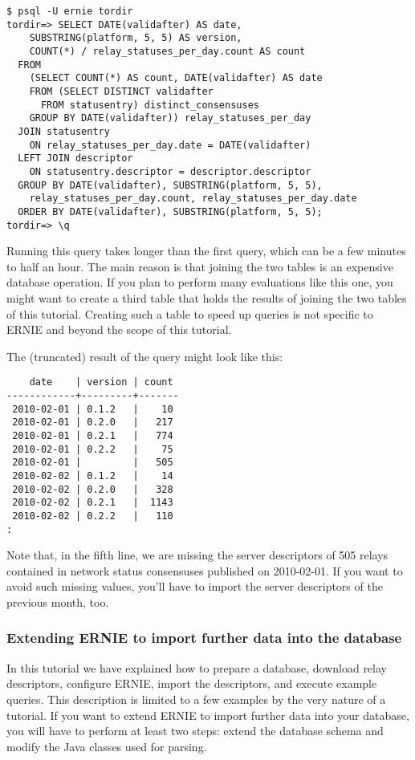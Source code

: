\documentclass{article}
\begin{document}
\begin{verbatim}
$ psql -U ernie tordir
tordir=> SELECT DATE(validafter) AS date,
    SUBSTRING(platform, 5, 5) AS version,
    COUNT(*) / relay_statuses_per_day.count AS count
  FROM
    (SELECT COUNT(*) AS count, DATE(validafter) AS date
    FROM (SELECT DISTINCT validafter
      FROM statusentry) distinct_consensuses
    GROUP BY DATE(validafter)) relay_statuses_per_day
  JOIN statusentry
    ON relay_statuses_per_day.date = DATE(validafter)
  LEFT JOIN descriptor
    ON statusentry.descriptor = descriptor.descriptor
  GROUP BY DATE(validafter), SUBSTRING(platform, 5, 5),
    relay_statuses_per_day.count, relay_statuses_per_day.date
  ORDER BY DATE(validafter), SUBSTRING(platform, 5, 5);
tordir=> \q
\end{verbatim}

Running this query takes longer than the first query, which can be a few
minutes to half an hour.
The main reason is that joining the two tables is an expensive database
operation.
If you plan to perform many evaluations like this one, you might want to
create a third table that holds the results of joining the two tables of
this tutorial.
Creating such a table to speed up queries is not specific to ERNIE and
beyond the scope of this tutorial.

The (truncated) result of the query might look like this:

\begin{verbatim}
    date    | version | count
------------+---------+-------
 2010-02-01 | 0.1.2   |    10
 2010-02-01 | 0.2.0   |   217
 2010-02-01 | 0.2.1   |   774
 2010-02-01 | 0.2.2   |    75
 2010-02-01 |         |   505
 2010-02-02 | 0.1.2   |    14
 2010-02-02 | 0.2.0   |   328
 2010-02-02 | 0.2.1   |  1143
 2010-02-02 | 0.2.2   |   110
:
\end{verbatim}

Note that, in the fifth line, we are missing the server descriptors of 505
relays contained in network status consensuses published on 2010-02-01.
If you want to avoid such missing values, you'll have to import the server
descriptors of the previous month, too.

\subsubsection{Extending ERNIE to import further data into the database}

In this tutorial we have explained how to prepare a database, download
relay descriptors, configure ERNIE, import the descriptors, and execute
example queries.
This description is limited to a few examples by the very nature of a
tutorial.
If you want to extend ERNIE to import further data into your database,
you will have to perform at least two steps:
extend the database schema and modify the Java classes used for parsing.
\end{document}
